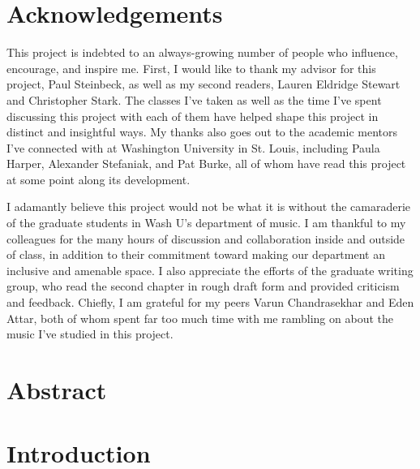 \documentclass[12pt]{report}
\begin{document}
\thispagestyle{empty}

\frenchspacing

\setcounter{page}{2}
    \tableofcontents
    \listoffigures
    \listoftables

    \chapter*{Acknowledgements}

 This project is indebted to an always-growing number of people who influence, encourage, and inspire me. First, I would like to thank my advisor for this project, Paul Steinbeck, as well as my second readers, Lauren Eldridge Stewart and Christopher Stark. The classes I've taken as well as the time I've spent discussing this project with each of them have helped shape this project in distinct and insightful ways. My thanks also goes out to the academic mentors I've connected with at Washington University in St. Louis, including Paula Harper, Alexander Stefaniak, and Pat Burke, all of whom have read this project at some point along its development.
 
I adamantly believe this project would not be what it is without the camaraderie of the graduate students in Wash U's department of music. I am thankful to my colleagues for the many hours of discussion and collaboration inside and outside of class, in addition to their commitment toward making our department an inclusive and amenable space. I also appreciate the efforts of the graduate writing group, who read the second chapter in rough draft form and provided criticism and feedback. Chiefly, I am grateful for my peers Varun Chandrasekhar and Eden Attar, both of whom spent far too much time with me rambling on about the music I've studied in this project.

    \chapter*{Abstract}
    \lipsum[0-1]

\chapter{Introduction}

\end{document}
